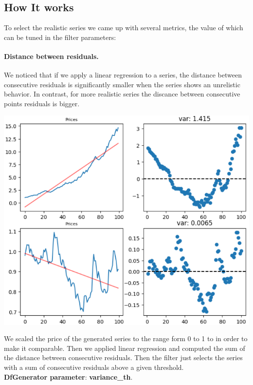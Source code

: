 \documentclass{article}
\begin{document}
\begin{multicols}{2}
    \section*{How It works}
    To select the realistic series we came up with several metrics, the value of which can be tuned in the filter parameters:
    \paragraph*{Distance between residuals.}
    We noticed that if we apply a linear regression to a series, the distance between consecutive residuals is significantly smaller when the series shows an unrelistic behavior.
    In contrast, for more realistic series the discance between consecutive points residuals is bigger.
    \begin{center}
        \includegraphics[scale=0.6]{imgs/2_res.png}
    \end{center}
    We scaled the price of the generated series to the range form 0 to 1 to in order to make it comparable. Then we applied linear regression and computed the sum of the distance between consecutive residuals. 
    Then the filter just selects the series with a sum of consecutive residuals above a given threshold.\\
    \textbf{DfGenerator parameter}:  \textbf{variance\_th}.

\end{multicols}
\end{document}
